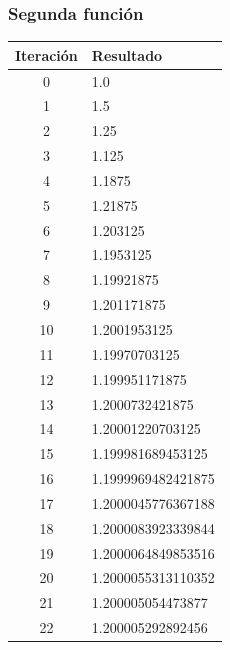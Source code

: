 \documentclass[titlepage,a4paper]{article}
\begin{document}
\subsubsection{Segunda función}\label{sec:bis2}
\begin{multicols}{2}
\begin{center}
    \begin{tabular}{| c | l |}
    \hline
     Iteración & Resultado \\ \hline
      0     &  1.0 \\
1     &  1.5 \\
2     &  1.25 \\
3     &  1.125 \\
4     &  1.1875 \\
5     &  1.21875 \\
6     &  1.203125 \\
7     &  1.1953125 \\
8     &  1.19921875 \\
9     &  1.201171875 \\
10     &  1.2001953125 \\
11     &  1.19970703125 \\
12     &  1.199951171875 \\
13     &  1.2000732421875 \\
14     &  1.20001220703125 \\
15     &  1.199981689453125 \\
16     &  1.1999969482421875 \\
17     &  1.2000045776367188 \\
18     &  1.2000083923339844 \\
19     &  1.2000064849853516 \\
20     &  1.2000055313110352 \\
21     &  1.200005054473877 \\
22     &  1.200005292892456 \\



\end{tabular}
\end{center}
\end{multicols}
\end{document}
